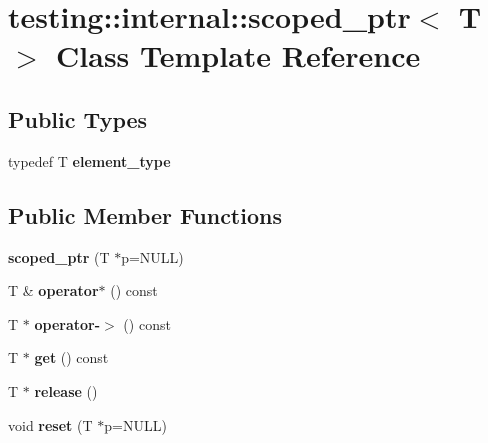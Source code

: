 \hypertarget{classtesting_1_1internal_1_1scoped__ptr}{}\section{testing\+:\+:internal\+:\+:scoped\+\_\+ptr$<$ T $>$ Class Template Reference}
\label{classtesting_1_1internal_1_1scoped__ptr}
\subsection*{Public Types}
\begin{DoxyCompactItemize}
\item 
typedef T {\bfseries element\+\_\+type}\hypertarget{classtesting_1_1internal_1_1scoped__ptr_ae755ffeebada8e20b68c1d1ffa91cf13}{}\label{classtesting_1_1internal_1_1scoped__ptr_ae755ffeebada8e20b68c1d1ffa91cf13}

\end{DoxyCompactItemize}
\subsection*{Public Member Functions}
\begin{DoxyCompactItemize}
\item 
{\bfseries scoped\+\_\+ptr} (T $\ast$p=N\+U\+LL)\hypertarget{classtesting_1_1internal_1_1scoped__ptr_adb972432999a0c63720df148964ac2a5}{}\label{classtesting_1_1internal_1_1scoped__ptr_adb972432999a0c63720df148964ac2a5}

\item 
T \& {\bfseries operator$\ast$} () const \hypertarget{classtesting_1_1internal_1_1scoped__ptr_ab197837f87062de69d9d6e04539bbabe}{}\label{classtesting_1_1internal_1_1scoped__ptr_ab197837f87062de69d9d6e04539bbabe}

\item 
T $\ast$ {\bfseries operator-\/$>$} () const \hypertarget{classtesting_1_1internal_1_1scoped__ptr_adc38310fbbe400faf9279e36000a17c4}{}\label{classtesting_1_1internal_1_1scoped__ptr_adc38310fbbe400faf9279e36000a17c4}

\item 
T $\ast$ {\bfseries get} () const \hypertarget{classtesting_1_1internal_1_1scoped__ptr_adc8f8fcb63ce69f80f011456e6d2f08d}{}\label{classtesting_1_1internal_1_1scoped__ptr_adc8f8fcb63ce69f80f011456e6d2f08d}

\item 
T $\ast$ {\bfseries release} ()\hypertarget{classtesting_1_1internal_1_1scoped__ptr_a7a4f3e568d81a5d8bcb5f8d6bf5130b1}{}\label{classtesting_1_1internal_1_1scoped__ptr_a7a4f3e568d81a5d8bcb5f8d6bf5130b1}

\item 
void {\bfseries reset} (T $\ast$p=N\+U\+LL)\hypertarget{classtesting_1_1internal_1_1scoped__ptr_acac03266a43359801aff0de5c990bec0}{}\label{classtesting_1_1internal_1_1scoped__ptr_acac03266a43359801aff0de5c990bec0}

\end{DoxyCompactItemize}
